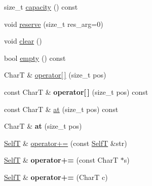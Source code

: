 \begin{CompactItemize}
\item 
size\_\-t \hyperlink{classvector__string_0831bcf35fac1ef12692f7aade586f7b}{capacity} () const 
\item 
void \hyperlink{classvector__string_6499804dfd9b47e4fd747ccd982c20eb}{reserve} (size\_\-t res\_\-arg=0)
\item 
void \hyperlink{classvector__string_f5c9e2462a6d6d5eac6cbf0246ba957f}{clear} ()
\item 
bool \hyperlink{classvector__string_1b6ed56a2ebb354a819c4830ebb6c23b}{empty} () const 
\item 
CharT \& \hyperlink{classvector__string_7f24c472b959ea7811105c6482872b6d}{operator\mbox{[}$\,$\mbox{]}} (size\_\-t pos)
\item 
\hypertarget{classvector__string_e845c248f0acdf57afc6628f43cbe14a}{
const CharT \& \textbf{operator\mbox{[}$\,$\mbox{]}} (size\_\-t pos) const }
\label{classvector__string_e845c248f0acdf57afc6628f43cbe14a}

\item 
const CharT \& \hyperlink{classvector__string_e262ba5e7759fb7e570c459c2ec064ce}{at} (size\_\-t pos) const 
\item 
\hypertarget{classvector__string_c3b73fb550c715f51e003f33c2f9bd4e}{
CharT \& \textbf{at} (size\_\-t pos)}
\label{classvector__string_c3b73fb550c715f51e003f33c2f9bd4e}

\item 
\hyperlink{classvector__string}{SelfT} \& \hyperlink{classvector__string_1ec6b1fc1e84f88d93a40084e4e01cef}{operator+=} (const \hyperlink{classvector__string}{SelfT} \&str)
\item 
\hypertarget{classvector__string_b59ec2a55bf01cf27f01a56a42bd3ea8}{
\hyperlink{classvector__string}{SelfT} \& \textbf{operator+=} (const CharT $\ast$s)}
\label{classvector__string_b59ec2a55bf01cf27f01a56a42bd3ea8}

\item 
\hypertarget{classvector__string_1b09004d55f08e6818f0690d4a8e4a64}{
\hyperlink{classvector__string}{SelfT} \& \textbf{operator+=} (CharT c)}
\label{classvector__string_1b09004d55f08e6818f0690d4a8e4a64}


\end{CompactItemize}
